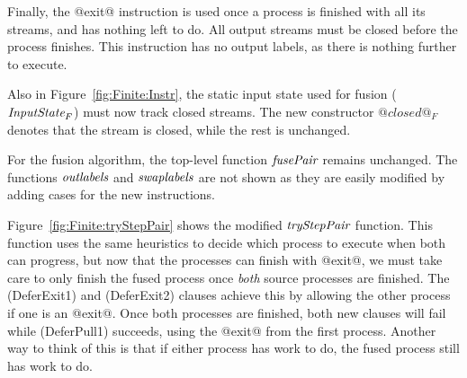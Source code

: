 Finally, the @exit@ instruction is used once a process is finished with all its streams, and has nothing left to do. All output streams must be closed before the process finishes. This instruction has no output labels, as there is nothing further to execute.

Also in Figure~\ref{fig:Finite:Instr}, the static input state used for fusion ($\textit{InputState}_F$) must now track closed streams. The new constructor $@closed@_F$ denotes that the stream is closed, while the rest is unchanged.

For the fusion algorithm, the top-level function $\textit{fusePair}$ remains unchanged. The functions $\textit{outlabels}$ and $\textit{swaplabels}$ are not shown as they are easily modified by adding cases for the new instructions.

Figure~\ref{fig:Finite:tryStepPair} shows the modified $\textit{tryStepPair}$ function. This function uses the same heuristics to decide which process to execute when both can progress, but now that the processes can finish with @exit@, we must take care to only finish the fused process once \emph{both} source processes are finished. The (DeferExit1) and (DeferExit2) clauses achieve this by allowing the other process if one is an @exit@. Once both processes are finished, both new clauses will fail while (DeferPull1) succeeds, using the @exit@ from the first process. Another way to think of this is that if either process has work to do, the fused process still has work to do.

